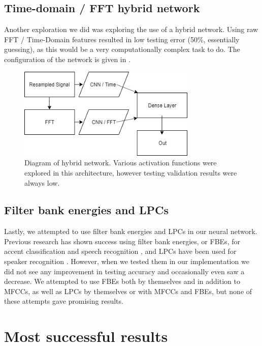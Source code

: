 \documentclass{article}
\begin{document}
\subsection{Time-domain / FFT hybrid network}
\label{subsec:fft}

Another exploration we did was exploring the use of a hybrid network.
Using raw FFT / Time-Domain features resulted in low testing error (50\%, essentially guessing), as this would be a very computationally complex task to do.
The configuration of the network is given in .

\begin{figure}[htb]
	\centering
	\includegraphics[width = 8.5cm]{figs/hybrid_network}
	\caption{Diagram of hybrid network.
	Various activation functions were explored in this architecture, however testing validation results were always low.}
	\label{fig:hybrid}
\end{figure}

\subsection{Filter bank energies and LPCs}
\label{subsec:fbe}

Lastly, we attempted to use filter bank energies and LPCs in our neural network.
Previous research has shown success using filter bank energies, or FBEs, for accent classification and speech recognition \cite{Paliwal, chuaccent}, and LPCs have been used for speaker recognition \cite{lpc}.
However, when we tested them in our implementation we did not see any improvement in testing accuracy and occasionally even saw a decrease.
We attempted to use FBEs both by themselves and in addition to MFCCs, as well as LPCs by themselves or with MFCCs and FBEs, but none of these attempts gave promising results.

\section{Most successful results}
\label{sec:success}
\end{document}
